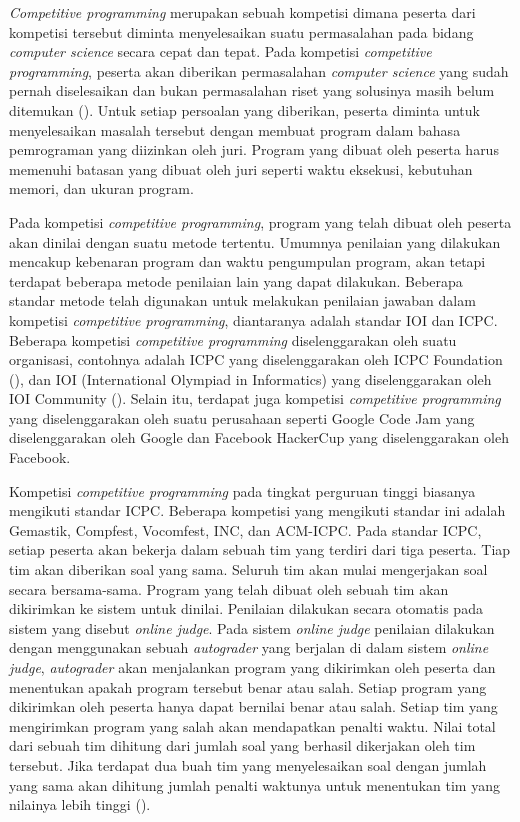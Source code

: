 \par \textit{Competitive programming} merupakan sebuah kompetisi dimana peserta dari kompetisi tersebut diminta menyelesaikan suatu permasalahan pada bidang \textit{computer science} secara cepat dan tepat. Pada kompetisi \textit{competitive programming}, peserta akan diberikan permasalahan \textit{computer science} yang sudah pernah diselesaikan dan bukan permasalahan riset yang solusinya masih belum ditemukan (\cite{halimsfcp3}). Untuk setiap persoalan yang diberikan, peserta diminta untuk menyelesaikan masalah tersebut dengan membuat program dalam bahasa pemrograman yang diizinkan oleh juri. Program yang dibuat oleh peserta harus memenuhi batasan yang dibuat oleh juri seperti waktu eksekusi, kebutuhan memori, dan ukuran program.
\par Pada kompetisi \textit{competitive programming}, program yang telah dibuat oleh peserta akan dinilai dengan suatu metode tertentu. Umumnya penilaian yang dilakukan mencakup kebenaran program dan waktu pengumpulan program, akan tetapi terdapat beberapa metode penilaian lain yang dapat dilakukan. Beberapa standar metode telah digunakan untuk melakukan penilaian jawaban dalam kompetisi \textit{competitive programming}, diantaranya adalah standar IOI dan ICPC. Beberapa kompetisi \textit{competitive programming} diselenggarakan oleh suatu organisasi, contohnya adalah ICPC yang diselenggarakan oleh ICPC Foundation (\cite{abouticpc}), dan IOI (International Olympiad in Informatics) yang diselenggarakan oleh IOI Community (\cite{ioiorg}). Selain itu, terdapat juga kompetisi \textit{competitive programming} yang diselenggarakan oleh suatu perusahaan seperti Google Code Jam yang diselenggarakan oleh Google dan Facebook HackerCup yang diselenggarakan oleh Facebook.
\par Kompetisi \textit{competitive programming} pada tingkat perguruan tinggi biasanya mengikuti standar ICPC. Beberapa kompetisi yang mengikuti standar ini adalah Gemastik, Compfest, Vocomfest, INC, dan ACM-ICPC. Pada standar ICPC, setiap peserta akan bekerja dalam sebuah tim yang terdiri dari tiga peserta. Tiap tim akan diberikan soal yang sama. Seluruh tim akan mulai mengerjakan soal secara bersama-sama. Program yang telah dibuat oleh sebuah tim akan dikirimkan ke sistem untuk dinilai. Penilaian dilakukan secara otomatis pada sistem yang disebut \textit{online judge}. Pada sistem \textit{online judge} penilaian dilakukan dengan menggunakan sebuah \textit{autograder} yang berjalan di dalam sistem \textit{online judge}, \textit{autograder} akan menjalankan program yang dikirimkan oleh peserta dan menentukan apakah program tersebut benar atau salah. Setiap program yang dikirimkan oleh peserta hanya dapat bernilai benar atau salah. Setiap tim yang mengirimkan program yang salah akan mendapatkan penalti waktu. Nilai total dari sebuah tim dihitung dari jumlah soal yang berhasil dikerjakan oleh tim tersebut. Jika terdapat dua buah tim yang menyelesaikan soal dengan jumlah yang sama akan dihitung jumlah penalti waktunya untuk menentukan tim yang nilainya lebih tinggi (\cite{wfrules}).

